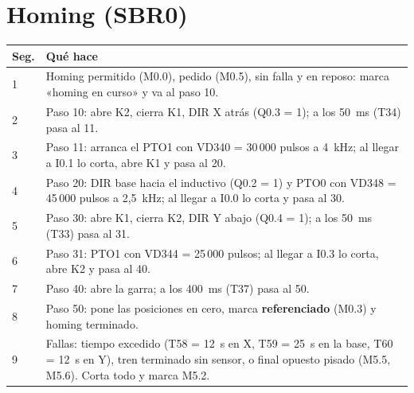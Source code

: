 \section{Homing (SBR0)}
\begin{center}\small
\begin{longtable}{>{\raggedright}p{1.2cm} >{\raggedright\arraybackslash}p{13.8cm}}
\toprule
\textbf{Seg.} & \textbf{Qué hace}\\
\midrule
\endhead
1 & Homing permitido (M0.0), pedido (M0.5), sin falla y en reposo: marca «homing en curso» y va al paso 10.\\
2 & Paso 10: abre K2, cierra K1, DIR X atrás (Q0.3 = 1); a los 50~ms (T34) pasa al 11.\\
3 & Paso 11: arranca el PTO1 con VD340 = 30\,000 pulsos a 4~kHz; al llegar a I0.1 lo corta, abre K1 y pasa al 20.\\
4 & Paso 20: DIR base hacia el inductivo (Q0.2 = 1) y PTO0 con VD348 = 45\,000 pulsos a 2,5~kHz; al llegar a I0.0 lo corta y pasa al 30.\\
5 & Paso 30: abre K1, cierra K2, DIR Y abajo (Q0.4 = 1); a los 50~ms (T33) pasa al 31.\\
6 & Paso 31: PTO1 con VD344 = 25\,000 pulsos; al llegar a I0.3 lo corta, abre K2 y pasa al 40.\\
7 & Paso 40: abre la garra; a los 400~ms (T37) pasa al 50.\\
8 & Paso 50: pone las posiciones en cero, marca \textbf{referenciado} (M0.3) y homing terminado.\\
9 & Fallas: tiempo excedido (T58 = 12~s en X, T59 = 25~s en la base, T60 = 12~s en Y), tren terminado sin sensor, o final opuesto pisado (M5.5, M5.6). Corta todo y marca M5.2.\\
\bottomrule
\end{longtable}
\end{center}

